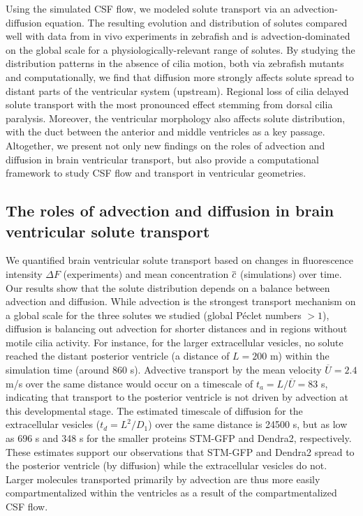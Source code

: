 \documentclass{WileyMSP-template}
\begin{document}
Using the simulated CSF flow, we modeled solute transport via an
advection-diffusion equation. The resulting evolution and distribution
of solutes compared well with data from in vivo experiments in
zebrafish and is advection-dominated on the global scale for a
physiologically-relevant range of solutes. By studying the
distribution patterns in the absence of cilia motion, both via
zebrafish mutants and computationally, we find that diffusion more
strongly affects solute spread to distant parts of the ventricular
system (upstream). Regional loss of cilia delayed solute transport
with the most pronounced effect stemming from dorsal cilia
paralysis. Moreover, the ventricular morphology also affects solute
distribution, with the duct between the anterior and middle ventricles
as a key passage. Altogether, we present not only new findings on the
roles of advection and diffusion in brain ventricular transport, but
also provide a computational framework to study CSF flow and transport
in ventricular geometries.

\subsection{The roles of advection and diffusion in brain ventricular solute transport}

We quantified brain ventricular solute transport based on changes in
fluorescence intensity $\Delta F$ (experiments) and mean concentration
$\overline{c}$ (simulations) over time. Our results show that the solute
distribution depends on a balance between advection and diffusion.
While advection is the strongest transport mechanism on a global scale
for the three solutes we studied (global Péclet numbers $> 1$),
diffusion is balancing out advection for shorter distances and in
regions without motile cilia activity.  For instance, for the larger
extracellular vesicles, no solute reached the distant posterior
ventricle (a distance of $L = 200$ \textmu m) within the simulation
time (around 860 s). Advective transport by the mean velocity
$\overline{U}=2.4$ \textmu m/s over the same distance would occur on a
timescale of $t_a=L/\overline{U}=83$ s, indicating that transport to
the posterior ventricle is not driven by advection at this
developmental stage. The estimated timescale of diffusion for the
extracellular vesicles ($t_d=L^2/D_1$) over the same distance is 24500
s, but as low as 696 s and 348 s for the smaller proteins STM-GFP and
Dendra2, respectively. These estimates support our observations that
STM-GFP and Dendra2 spread to the posterior ventricle (by diffusion)
while the extracellular vesicles do not. Larger molecules transported
primarily by advection are thus more easily compartmentalized within
the ventricles as a result of the compartmentalized CSF flow.
\end{document}
